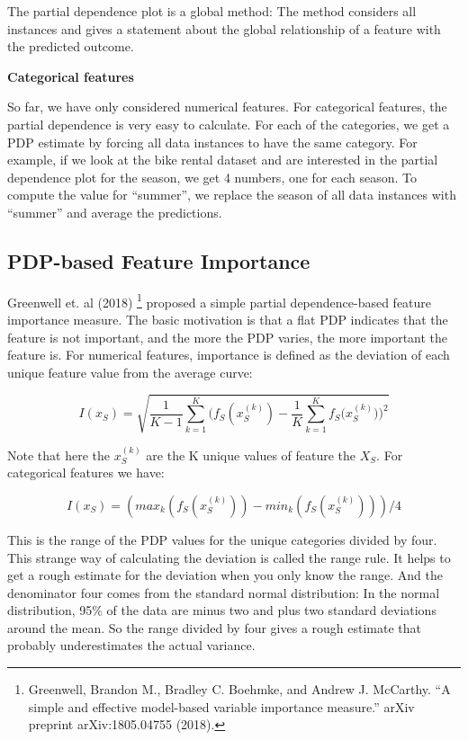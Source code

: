 \documentclass[
  12pt,
]{krantz}
\begin{document}
The partial dependence plot is a global method:
The method considers all instances and gives a statement about the global relationship of a feature with the predicted outcome.

\textbf{Categorical features}

So far, we have only considered numerical features.
For categorical features, the partial dependence is very easy to calculate.
For each of the categories, we get a PDP estimate by forcing all data instances to have the same category.
For example, if we look at the bike rental dataset and are interested in the partial dependence plot for the season, we get 4 numbers, one for each season.
To compute the value for ``summer'', we replace the season of all data instances with ``summer'' and average the predictions.

\hypertarget{pdp-based-feature-importance}{%
\subsection{PDP-based Feature Importance}\label{pdp-based-feature-importance}}

Greenwell et. al (2018) \footnote{Greenwell, Brandon M., Bradley C. Boehmke, and Andrew J. McCarthy. ``A simple and effective model-based variable importance measure.'' arXiv preprint arXiv:1805.04755 (2018).} proposed a simple partial dependence-based feature importance measure.
The basic motivation is that a flat PDP indicates that the feature is not important, and the more the PDP varies, the more important the feature is.
For numerical features, importance is defined as the deviation of each unique feature value from the average curve:

\[I(x_S) =  \sqrt{\frac{1}{K-1}\sum_{k=1}^K(f_S(x^{(k)}_S) - \frac{1}{K}\sum_{k=1}^K f_S({x^{(k)}_S))^2}}\]

Note that here the \(x^{(k)}_S\) are the K unique values of feature the \(X_S\).
For categorical features we have:

\[I(x_S) = (max_k(f_S(x^{(k)}_S)) - min_k(f_S(x^{(k)}_S)))/4\]

This is the range of the PDP values for the unique categories divided by four.
This strange way of calculating the deviation is called the range rule.
It helps to get a rough estimate for the deviation when you only know the range.
And the denominator four comes from the standard normal distribution:
In the normal distribution, 95\% of the data are minus two and plus two standard deviations around the mean.
So the range divided by four gives a rough estimate that probably underestimates the actual variance.
\end{document}
